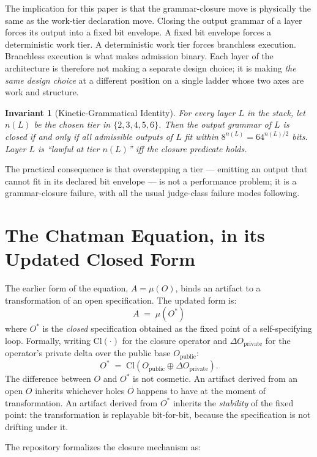 \documentclass[11pt,letterpaper]{article}
\newtheorem{invariant}{Invariant}
\begin{document}
The implication for this paper is that the grammar-closure move is physically the same as the work-tier declaration move. Closing the output grammar of a layer forces its output into a fixed bit envelope. A fixed bit envelope forces a deterministic work tier. A deterministic work tier forces branchless execution. Branchless execution is what makes admission binary. Each layer of the architecture is therefore not making a separate design choice; it is making \emph{the same design choice} at a different position on a single ladder whose two axes are work and structure.

\begin{invariant}[Kinetic-Grammatical Identity]
For every layer $L$ in the stack, let $n(L)$ be the chosen tier in $\{2,3,4,5,6\}$. Then the output grammar of $L$ is closed if and only if all admissible outputs of $L$ fit within $8^{n(L)} = 64^{n(L)/2}$ bits. Layer $L$ is ``lawful at tier $n(L)$'' iff the closure predicate holds.
\end{invariant}

The practical consequence is that overstepping a tier --- emitting an output that cannot fit in its declared bit envelope --- is not a performance problem; it is a grammar-closure failure, with all the usual judge-class failure modes following.

\section{The Chatman Equation, in its Updated Closed Form}

The earlier form of the equation, \( A = \mu(O) \), binds an artifact to a transformation of an open specification. The updated form is:
\[
\boxed{\; A \;=\; \mu(O^{\ast}) \;}
\]
where $O^{\ast}$ is the \emph{closed} specification obtained as the fixed point of a self-specifying loop. Formally, writing $\mathrm{Cl}(\cdot)$ for the closure operator and $\Delta O_{\mathrm{private}}$ for the operator's private delta over the public base $O_{\mathrm{public}}$:
\[
O^{\ast} \;=\; \mathrm{Cl}\!\left(O_{\mathrm{public}} \oplus \Delta O_{\mathrm{private}}\right).
\]
The difference between $O$ and $O^{\ast}$ is not cosmetic. An artifact derived from an open $O$ inherits whichever holes $O$ happens to have at the moment of transformation. An artifact derived from $O^{\ast}$ inherits the \emph{stability} of the fixed point: the transformation is replayable bit-for-bit, because the specification is not drifting under it.

The repository formalizes the closure mechanism as:
\end{document}
